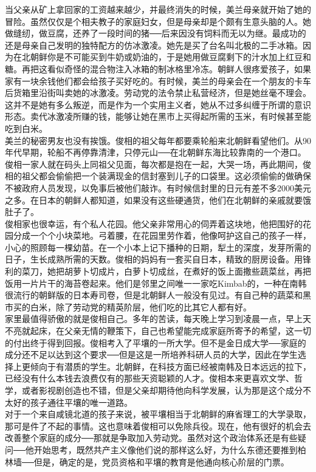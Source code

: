 当父亲从矿上拿回家的工资越来越少，并最终消失的时候，美兰母亲就开始了她的冒险。虽然仅仅是个相夫教子的家庭妇女，但是母亲却是个颇有生意头脑的人。她做缝纫，做豆腐，还养了一段时间的猪──后来因没有饲料而无以为继。最成功的还是母亲自己发明的独特配方的仿冰激凌。她先是买了台名叫北极的二手冰箱。因为在北朝鲜你是不可能买到牛奶或奶油的，于是她用做豆腐剩下的汁水加上红豆和糖。再把这看似奇怪的混合物注入冰箱的制冰格里冷冻。朝鲜人很疼爱孩子，如果家有一块余钱他们都会给孩子买好吃的。有时候，美兰的母亲会在一个朋友的卡车后货箱里沿街叫卖她的冰激凌。劳动党的法令禁止私营经济，但是她丝毫不理会。这并不是她有多么叛逆，而是作为一个实用主义者，她从不过多纠缠于所谓的意识形态。卖代冰激凌所赚的钱，能够让她在黑市上买得起所需的玉米，有时候甚至能吃到白米。\\

美兰的秘密男友也没有挨饿。俊相的祖父每年都要乘轮船来北朝鲜看望他们。从90年代早期，轮船不再停靠清津，只停元山──在北朝鲜东海比较靠南的一个港口。俊相一家人就在码头上同祖父见面，每次都是抱在一起，大哭一场，再此期间，俊相的祖父都会偷偷把一个装满现金的信封塞到儿子的口袋里。这必须偷偷的做确保不被政府人员发现，以免事后被他们敲诈。有时候信封里的日元有差不多2000美元之多。在日本的朝鲜人都知道，如果没有这些硬通货，他们在北朝鲜的亲戚就要饿肚子了。\\

俊相家也很幸运，有个私人花园。他父亲非常用心的伺弄着这块地，他把围好的花园分成一个个小块菜地。弓着腰，在花园里劳作着，他像呵护这自己的孩子一样，小心的照顾每一棵幼苗。在一个小本上记下播种的日期，犁土的深度，发芽所需的日子，生长成熟所需的天数。俊相的妈妈有一套买自日本，精致的厨房设备。用锋利的菜刀，她把胡萝卜切成片，白萝卜切成丝，在煮好的饭上面撒些蔬菜丝，再把饭用一片片干的海苔卷起来。他们是邻里之间唯一一家吃Kimbab的，一种在南韩很流行的朝鲜版的日本寿司卷，但是北朝鲜人一般没有见过。有自己种的蔬菜和黑市买的白米，除了劳动党的精英阶层，他们吃的比其它人都有好。\\

家里最值得骄傲的就是俊相自己。多年的苦读，每天晚上学习到凌晨一点，早上天不亮就起床，在父亲无情的鞭策下，自己也希望能完成家庭所寄予的希望，这一切的付出终于得到回报。俊相考入了平壤的一所大学。但不是金日成大学──家庭的成分还不足以达到这个要求──但是这是一所培养科研人员的大学，因此在学生选择上更倾向于有潜质的学生。北朝鲜，在科技方面已经被南韩及日本远远的拉下，已经没有什么本钱去浪费仅有的那些天资聪颖的人才。俊相本来更喜欢文学、哲学，或者影视剧创造也不错，但是父亲却期待他向科学发展，认为那是这个成分不太好的孩子通往平壤的唯一道路。\\

对于一个来自咸镜北道的孩子来说，被平壤相当于北朝鲜的麻省理工的大学录取，那可是件了不起的事情。这也意味着俊相可以免除兵役。现在，他有很好的机会去改善整个家庭的成分──那就是争取加入劳动党。虽然对这个政治体系还是有些疑问──他开始思考，既然共产主义像他们说的那样这么好，为什么东德还要推到柏林墙──但是，确定的是，党员资格和平壤的教育是他通向核心阶层的门票。\\


